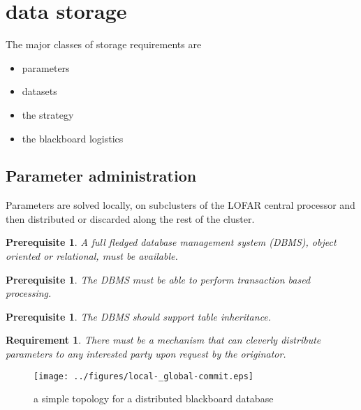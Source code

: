 \documentclass[]{lofar}
\newtheorem{requirement}{Requirement}[subsection]
\newtheorem{prerequisite}[enumi]{Prerequisite}
\begin{document}
  \section{data storage}
  \label{sec:data-storage}\hypertarget{sec:data-storage}{}

    The major classes of storage requirements are

    \begin{itemize}
      \item parameters
      \item datasets
      \item the strategy
      \item the blackboard logistics
    \end{itemize}

    \subsection{Parameter administration}
    \label{subsec:parameter-administration}\hypertarget{subsec:parameter-administration}{}

      Parameters are solved locally, on subclusters of the LOFAR
      central processor and then distributed or discarded along the
      rest of the cluster.

      \begin{prerequisite}
        A full fledged database management system (DBMS),
        object oriented or relational, must be available.
        \label{pre:dbms}
      \end{prerequisite}

      \begin{prerequisite}
        The DBMS must be able to perform transaction based processing.
        \label{pre:transactions}
      \end{prerequisite}

      \begin{prerequisite}
        The DBMS should support table inheritance.
        \label{pre:table-inheritance}
      \end{prerequisite}

      \begin{requirement}
        There must be a mechanism that can cleverly distribute
        parameters to any interested party upon request by the
        originator.\label{req:parameter-distribution}
      \end{requirement}

      \begin{figure}
        \texttt{[image: ../figures/local-\_global-commit.eps]}
        \hypertarget{fig:localGlobalCommit}{}
        \caption{a simple topology for a distributed blackboard database\label{fig:localGlobalCommit}}
      \end{figure}
\end{document}
